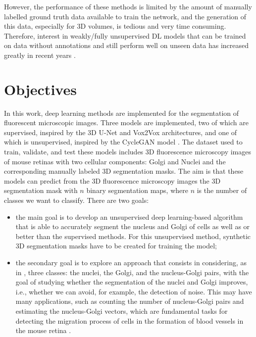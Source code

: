 However, the performance of these methods is limited by the amount of manually labelled ground truth data available to train the network, and the generation of this data, especially for \ac{3D} volumes, is tedious and very time consuming. Therefore, interest in weakly/fully unsupervised \ac{DL} models that can be trained on data without annotations and still perform well on unseen data has increased greatly in recent years \cite{review:3}.



\section{Objectives}
\label{section:objectives}

In this work, deep learning methods are implemented for the segmentation of fluorescent microscopic images. Three models are implemented, two of which are supervised, inspired by the \ac{3D} U-Net \cite{Unet:3D} and Vox2Vox \cite{isola2018imagetoimage} architectures, and one of which is unsupervised, inspired by the CycleGAN model \cite{cycleGAN:original}. The dataset used to train, validate, and test these models includes \ac{3D} fluorescence microscopy images of mouse retinas with two cellular components: Golgi and Nuclei and the corresponding manually labeled \ac{3D} segmentation masks. The aim is that these models can predict from the \ac{3D} fluorescence microscopy images the \ac{3D} segmentation mask with $n$ binary segmentation maps, where $n$ is the number of classes we want to classify. There are two goals:

\begin{itemize} 

\item the main goal is to develop an unsupervised deep learning-based algorithm that is able to accurately segment the nucleus and Golgi of cells as well as or better than the supervised methods. For this unsupervised method, synthetic \ac{3D} segmentation masks have to be created for training the model; 

\item the secondary goal is to explore an approach that consists in considering, as in \cite{nuclei&golgi}, three classes: the nuclei, the Golgi, and the nucleus-Golgi pairs, with the goal of studying whether the segmentation of the nuclei and Golgi improves, i.e., whether we can avoid, for example, the detection of noise. This may have many applications, such as counting the number of nucleus-Golgi pairs and estimating the nucleus-Golgi vectors, which are fundamental tasks for detecting the migration process of cells in the formation of blood vessels in the mouse retina \cite{nuclei&golgi}.
\end{itemize}

